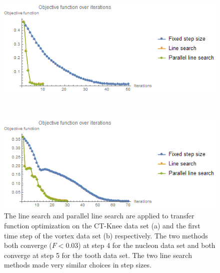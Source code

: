 \begin{figure}
	\centering
	\begin{minipage}{.49\textwidth}
		\includegraphics[width=1\linewidth]{images/CT-Knee_naive_rms_fixed_linesearch_parallel}
		\subcaption{}
	\end{minipage}~
	\begin{minipage}{.49\textwidth}
		\includegraphics[width=1\linewidth]{images/vortex_naive_rms_fixed_linesearch_parallel}
		\subcaption{}
	\end{minipage}
	\caption[The line search and parallel line search are applied to transfer function optimization on the CT-Knee data set and the first time step of the vortex data set respectively.]{The line search and parallel line search are applied to transfer function optimization on the CT-Knee data set (a) and the first time step of the vortex data set (b) respectively. The two methods both converge ($F<0.03$) at step 4 for the nucleon data set and both converge at step 5 for the tooth data set. The two line search methods made very similar choices in step sizes.}
	\label{fig:CT-Knee_naive_vortex_naive_rms_linesearch}
\end{figure}

